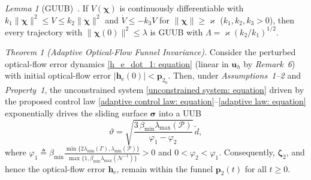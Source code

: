 \documentclass{IEEEtaes}
\begin{document}
\textit{Lemma 1} (GUUB)~\cite{khalil2002}. If $V(\boldsymbol{\chi})$ is continuously differentiable with $k_1\|\boldsymbol{\chi}\|^2\le V\le k_2\|\boldsymbol{\chi}\|^2$ and $\dot{V}\le -k_3 V$ for $\|\boldsymbol{\chi}\|\ge\varkappa$ ($k_1,k_2,k_3>0$), then every trajectory with $\|\boldsymbol{\chi}(0)\|^2\le\lambda$ is GUUB with $\Lambda = \varkappa(k_2/k_1)^{1/2}$.

\textit{Theorem 1 (Adaptive Optical-Flow Funnel Invariance).}
Consider the perturbed optical-flow error dynamics \eqref{h_e_dot_1: equation} (linear in $\boldsymbol{u}_h$ by \textit{Remark~6}) with initial optical-flow error $|\boldsymbol{h}_\text{e}(0)|<\boldsymbol{p}_{2_0}$. Then, under \textit{Assumptions~1--2} and \textit{Property~1}, the unconstrained system \eqref{unconstrained system: equation} driven by the proposed control law \eqref{adaptive control law: equation}--\eqref{adaptive law: equation} exponentially drives the sliding surface $\boldsymbol{\sigma}$ into a UUB
\begin{equation} \label{UUB bound: equation}
    \vartheta = \sqrt{\frac{3\,\beta_{\min}\lambda_{\max}(\mathcal{P})}{\varphi_1-\varphi_2}}\,\tilde{d},
\end{equation}
where $\varphi_1 \triangleq \beta_{\min}\frac{\min\{2\lambda_{\min}(\Gamma),\lambda_{\min}(\mathcal{P})\}}{\max\{1,\beta_{\min}\lambda_{\max}(\mathcal{N}^{-1})\}}>0$ and $0<\varphi_2<\varphi_1$. Consequently, $\boldsymbol{\zeta}_2$, and hence the optical-flow error $\boldsymbol{h}_\text{e}$, remain within the funnel $\boldsymbol{p}_2(t)$ for all $t\ge 0$.
\end{document}
